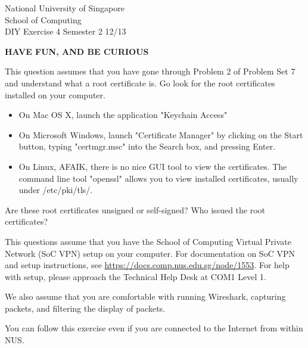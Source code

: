\documentclass[a4paper,11pt]{exam}
\begin{document}
\extraheadheight{.5in}
%
{\large\sf National University of Singapore\\ School of Computing \\
\LARGE\sf DIY Exercise 4}%
{\large\sf Semester 2 12/13}
\firstpageheadrule
\pagestyle{headandfoot}

\begin{center}
	\textbf\textsf{HAVE FUN, AND BE CURIOUS}
\end{center}

\begin{questions}

\question This question assumes that you have gone through Problem 2 of Problem Set 7 and understand what a root certificate is.  Go look for the root certificates installed on your computer.  
\begin{itemize}
\item On Mac OS X, launch the application "Keychain Access"
\item On Microsoft Windows, launch "Certificate Manager" by clicking on the Start button, typing "certmgr.msc" into the Search box, and pressing Enter.
\item On Linux, AFAIK, there is no nice GUI tool to view the certificates.  The command line tool "openssl" allows you to view installed certificates, usually under /etc/pki/tls/.
\end{itemize}

Are these root certificates unsigned or self-signed?  Who issued the root certificates?

\question
This questions assume that you have the School of Computing Virtual Private Network (SoC VPN) setup on your computer.  For documentation on SoC VPN and setup instructions, see \url{https://docs.comp.nus.edu.sg/node/1553}.  For help with setup, please approach the Technical Help Desk at COM1 Level 1.

We also assume that you are comfortable with running Wireshark, capturing packets, and 
filtering the display of packets. 

You can follow this exercise even if you are connected to the Internet from within NUS.

\end{questions}
\end{document}
